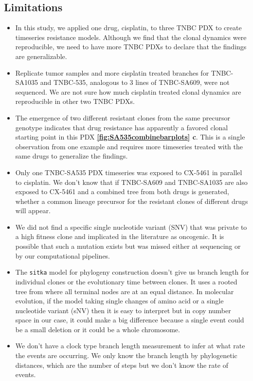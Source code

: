 \subsection{Limitations}
\begin {itemize}

\item In this study, we applied one drug, cisplatin, to three TNBC PDX to create timeseries resistance models. Although we find that the clonal dynamics were reproducible, we need to have more TNBC PDXs to declare that the findings are generalizable. 

\item Replicate tumor samples and more cisplatin treated branches for TNBC-SA1035 and TNBC-535, analogous to 3 lines of TNBC-SA609, were not sequenced. We are not sure how much cisplatin treated clonal dynamics are reproducible in other two TNBC PDXs. 

\item The emergence of two different resistant clones from the same precursor genotype indicates that drug resistance has apparently a favored clonal starting point in this PDX \textbf{\autoref{fig:SA535combinebarplots} c}. This is a single observation from one example and requires more timeseries treated with the same drugs to generalize the findings.

\item Only one TNBC-SA535 PDX timeseries was exposed to CX-5461 in parallel to cisplatin. We don't know that if TNBC-SA609 and TNBC-SA1035 are also exposed to CX-5461 and a combined tree from both drugs is generated, whether a common lineage precursor for the resistant clones of different drugs will appear.

\item We did not find a specific single nucleotide variant (SNV) that was private to a high fitness clone and implicated in the literature as oncogenic. It is possible that such a mutation exists but was missed either at sequencing or by our computational pipelines.

\item The \texttt{sitka} model for phylogeny construction doesn't give us branch length for individual clones or the evolutionary time between clones. It  uses a rooted tree from where all terminal nodes are at an equal distance. In molecular evolution, if the model taking single changes of amino acid or a single nucleotide variant (sNV) then it is easy to interpret but in copy number space in our case, it could make a big difference because a single event could be a small deletion or it could be a whole chromosome. 

\item We don't have a clock type branch length measurement to infer at what rate the events are occurring. We only know the branch length by phylogenetic distances, which are the number of steps but we don't know the rate of events.


\end {itemize}
